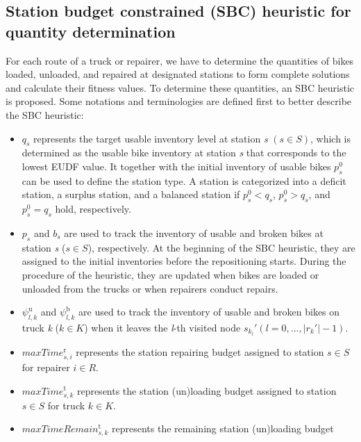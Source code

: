 \subsection{Station budget constrained (SBC) heuristic for quantity determination}\label{ch4:subsec:sbc-heuristic}

For each route of a truck or repairer, we have to determine the quantities of bikes loaded,
unloaded, and repaired at designated stations to form complete solutions and calculate their fitness
values. To determine these quantities, an SBC heuristic is proposed. Some notations and
terminologies are defined first to better describe the SBC heuristic:

\begin{itemize}
\item
  \(q_{s}\) represents the target usable inventory level at station \emph{s}
  \(\left( {s \in S} \right)\), which is determined as the usable bike inventory at station \emph{s}
  that corresponds to the lowest EUDF value. It together with the initial inventory of usable bikes
  \(p_{s}^{0}\) can be used to define the station type. A station is categorized into a deficit
  station, a surplus station, and a balanced station if \(p_{s}^{0} < q_{s}\),
  \(p_{s}^{0} > q_{s}\), and \(p_{s}^{0} = q_{s}\) hold, respectively.
\item
  \(p_{s}\) and \(b_{s}\) are used to track the inventory of usable and broken bikes at station
  \emph{s} (\(s \in S\)), respectively. At the beginning of the SBC heuristic, they are assigned to
  the initial inventories before the repositioning starts. During the procedure of the heuristic,
  they are updated when bikes are loaded or unloaded from the trucks or when repairers conduct
  repairs.
\item
  \(\psi_{l,k}^{\text{u}}\) and \(\psi_{l,k}^{\text{b}}\) are used to track the inventory of usable
  and broken bikes on truck \emph{k} (\(k \in K\)) when it leaves the \emph{l}-th visited node
  \(s_{k_{l}}'\left( {l = 0,...,\left| r_{k}' \right| - 1} \right)\).
\item
  \(\mathit{maxTim}e_{s,i}^{\text{r}}\) represents the station repairing budget assigned to station
  \(s \in S\) for repairer \(i \in R\).
\item
  \(\mathit{maxTim}e_{s,k}^{\text{t}}\) represents the station (un)loading budget assigned to
  station \(s \in S\) for truck \(k \in K\).
\item
  \(\mathit{maxTimeRemai}n_{s,k}^{\text{t}}\) represents the remaining station (un)loading budget

\end{itemize}
